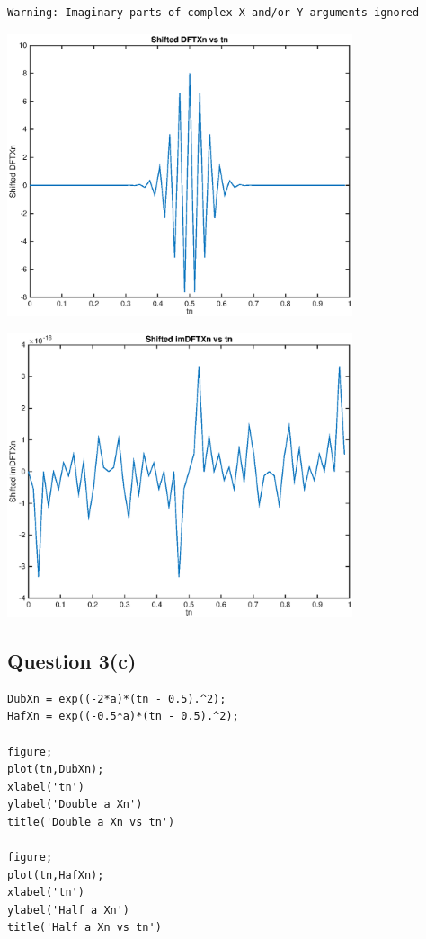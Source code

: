 \documentclass{article}
\begin{document}
        \color{lightgray} \begin{verbatim}Warning: Imaginary parts of complex X and/or Y arguments ignored 
\end{verbatim} \color{black}
    
\includegraphics [width=4in]{untitled_04.eps}

\includegraphics [width=4in]{untitled_05.eps}


\subsection*{Question 3(c)}

\begin{verbatim}
DubXn = exp((-2*a)*(tn - 0.5).^2);
HafXn = exp((-0.5*a)*(tn - 0.5).^2);

figure;
plot(tn,DubXn);
xlabel('tn')
ylabel('Double a Xn')
title('Double a Xn vs tn')

figure;
plot(tn,HafXn);
xlabel('tn')
ylabel('Half a Xn')
title('Half a Xn vs tn')
\end{verbatim}
\end{document}
